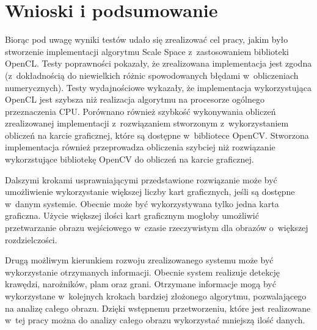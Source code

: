 \chapter{Wnioski i podsumowanie}
\label{cha:podsumowanie}

Biorąc pod uwagę wyniki testów udało się zrealizować cel pracy, jakim było stworzenie implementacji algorytmu Scale Space z~zastosowaniem biblioteki OpenCL. Testy poprawności pokazały, że zrealizowana implementacja jest zgodna (z~dokładnością do niewielkich różnic spowodowanych błędami w~obliczeniach numerycznych). Testy wydajnościowe wykazały, że implementacja wykorzystująca OpenCL jest szybsza niż realizacja algorytmu na procesorze ogólnego przeznaczenia CPU. Porównano również szybkość wykonywania obliczeń zrealizowanej implementacji z~rozwiązaniem stworzonym z~wykorzystaniem obliczeń na karcie graficznej, które są dostępne w~bibliotece OpenCV. Stworzona implementacja również przeprowadza obliczenia szybciej niż rozwiązanie wykorzstujące bibliotekę OpenCV do obliczeń na karcie graficznej.

Dalszymi krokami usprawniającymi przedstawione rozwiązanie może być umożliwienie wykorzystanie większej liczby kart graficznych, jeśli są dostępne w~danym systemie. Obecnie może być wykorzystywana tylko jedna karta graficzna. Użycie większej ilości kart graficznym mogłoby umożliwić przetwarzanie obrazu wejściowego w~czasie rzeczywistym dla obrazów o~większej rozdzielczości.

Drugą możliwym kierunkiem rozwoju zrealizowanego systemu może być wykorzystanie otrzymanych informacji. Obecnie system realizuje detekcję krawędzi, narożników, plam oraz grani. Otrzymane informacje mogą być wykorzystane w~kolejnych krokach bardziej złożonego algorytmu, pozwalającego na analizę całego obrazu. Dzięki wstępnemu przetworzeniu, które jest realizowane w~tej pracy można do analizy całego obrazu wykorzystać mniejszą ilość danych.
	